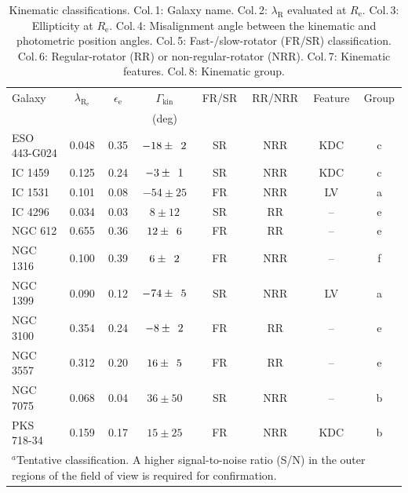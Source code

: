 \documentclass[a4paper,fleqn,usenatbib]{mnras}
\begin{document}
	\begin{table}
		\centering
		\caption{Kinematic classifications. Col.\,1: Galaxy name. Col.\,2: $\lambda_\text{R}$ evaluated at $R_\text{e}$. Col.\,3: Ellipticity at $R_\text{e}$. Col.\,4: Misalignment angle between the kinematic and photometric position angles. Col.\,5: Fast-/slow-rotator (FR/SR) classification. Col.\,6: Regular-rotator (RR) or non-regular-rotator (NRR). Col.\,7: Kinematic features. Col.\,8: Kinematic group.}
		\label{tab:classify}
		\begin{tabular}{l c c c c c c c}
			\hline
			\hline
			Galaxy		& $\lambda_\mathrm{R_e}$ & $\epsilon_\text{e}$  & $\Gamma_\text{kin}$ & FR/SR 	& RR/NRR 	& Feature & Group 	\\
			 & & & (deg) \\
			\hline 
			ESO 443-G024 & 0.048 & 0.35 & $-18\pm\leavevmode\phantom{0}2$	& SR & NRR & KDC & c \\
			IC 1459 	& 0.125 & 0.24 & \leavevmode\phantom{0}$-3\pm\leavevmode\phantom{0}1$ & SR & NRR & KDC & c \\
			IC 1531 	& 0.101 & 0.08 & $-54\pm25$	& FR & NRR & LV & a \\
			IC 4296		& 0.034 & 0.03 & \leavevmode\phantom{$-0$}$8\pm12$ & SR &\leavevmode\phantom{N}RR & -- & e \\
			NGC 612 	& 0.655 & 0.36 & \leavevmode\phantom{$-$}$12\pm\leavevmode\phantom{0}6$	& FR &\leavevmode\phantom{N}RR & -- & e \\
			NGC 1316 	& 0.100 & 0.39 & \leavevmode\phantom{$-0$}$6\pm\leavevmode\phantom{0}2$ & FR & NRR & -- & f \\
			NGC 1399 	& 0.090 & 0.12 & $-74\pm\leavevmode\phantom{0}5$ & SR & NRR & LV & a \\
			NGC 3100 	& 0.354 & 0.24 & \leavevmode\phantom{0}$-8\pm\leavevmode\phantom{0}2$ & FR &\leavevmode\phantom{N}RR & -- & e \\
			NGC 3557 	& 0.312 & 0.20 & \leavevmode\phantom{$-$}$16\pm\leavevmode\phantom{0}5$ & FR &\leavevmode\phantom{N}RR & -- & e\\
			NGC 7075 	& 0.068 & 0.04 & \leavevmode\phantom{$-$}$36\pm50$ & SR & NRR & -- & b \\
			PKS 718-34  & 0.159 & 0.17 & \leavevmode\phantom{$-$}$15\pm25$ & FR & NRR & KDC\tnote{a} & b\\
			\hline
			\hline
			\multicolumn{8}{l}{$^{a}$Tentative classification. A higher signal-to-noise ratio (S/N) in the outer regions of the field of view is required for confirmation.}


\end{tabular}
\end{table}
\end{document}
